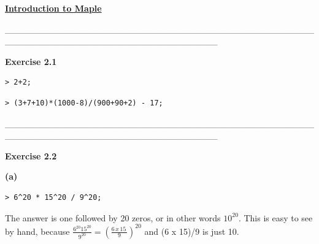 \documentclass{article}
\begin{document}
\lstset{basicstyle=\ttfamily,breaklines=true,columns=flexible}
\pagestyle{empty}
\begin{center}
\begin{Maple Title}
\underline{\textbf{Introduction to Maple}}
\end{Maple Title}
\end{center}
\begin{Maple Normal}
\_\_\_\_\_\_\_\_\_\_\_\_\_\_\_\_\_\_\_\_\_\_\_\_\_\_\_\_\_\_\_\_\_\_\_\_\_\_\_\_\_\_\_\_\_\_\_\_\_\_\_\_\_\_\_\_\_\_\_\_\_\_\_\_\_\_\_\_\_\_\_\_\_\_\_\_\_\_\_\_\_
\end{Maple Normal}
\begin{Maple Heading 2}
\textbf{Exercise 2.1}
\end{Maple Heading 2}
\begin{lstlisting}
> 2+2;
\end{lstlisting}
\begin{lstlisting}
> (3+7+10)*(1000-8)/(900+90+2) - 17;
\end{lstlisting}
\begin{Maple Normal}
\_\_\_\_\_\_\_\_\_\_\_\_\_\_\_\_\_\_\_\_\_\_\_\_\_\_\_\_\_\_\_\_\_\_\_\_\_\_\_\_\_\_\_\_\_\_\_\_\_\_\_\_\_\_\_\_\_\_\_\_\_\_\_\_\_\_\_\_\_\_\_\_\_\_\_\_\_\_\_\_\_
\end{Maple Normal}
\begin{Maple Heading 2}
\textbf{Exercise 2.2}
\end{Maple Heading 2}
\begin{Maple Normal}
\textbf{(a)}
\end{Maple Normal}
\begin{lstlisting}
> 6^20 * 15^20 / 9^20;
\end{lstlisting}
\begin{Maple Normal}
The answer is one followed by 20 zeros, or in other words 
$ 10^{20} $.  This is easy to see by hand, because 
$ \frac{6^{20} 15^{20}}{9^{20}}=(\frac{\mathit{6\,x\,15\,}}{9})^{20} $ and (6 x 15)/9 is just 10.
\end{Maple Normal}
\end{document}
